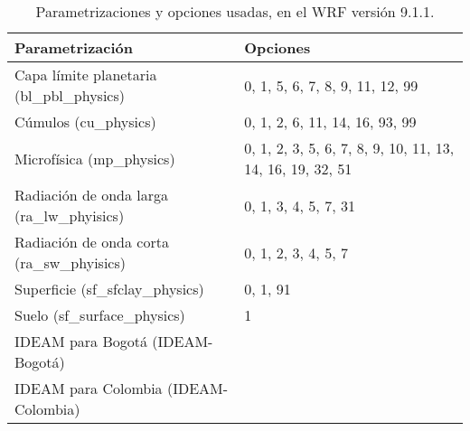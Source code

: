 \begin{itemize}
\begin{table}[H]
\caption{Parametrizaciones y opciones usadas, en el WRF versión 9.1.1.}
\label{tabla_parametrizacion_opciones}
\begin{tabular}{lp{8cm}}
Parametrización & Opciones \\ \hline
Capa límite planetaria (bl\_pbl\_physics) & 0, 1, 5, 6, 7, 8, 9, 11, 12, 99 \\ %
Cúmulos (cu\_physics)      & 0, 1, 2, 6, 11, 14, 16, 93, 99 \\ %
Microfísica (mp\_physics)      & 0, 1, 2, 3, 5, 6, 7, 8, 9, 10, 11, 13, 14, 16, 19, 32, 51 \\%
Radiación de onda larga (ra\_lw\_phyisics) & 0, 1, 3, 4, 5, 7, 31 \\%
Radiación de onda corta (ra\_sw\_phyisics) & 0, 1, 2, 3, 4, 5, 7 \\%
Superficie (sf\_sfclay\_physics) & 0, 1, 91\\ %
Suelo (sf\_surface\_physics) & 1 \\ %
IDEAM para Bogotá (IDEAM-Bogotá) & \\
IDEAM para Colombia (IDEAM-Colombia) & \\ %
\end{tabular}
\end{table}



\end{itemize}
